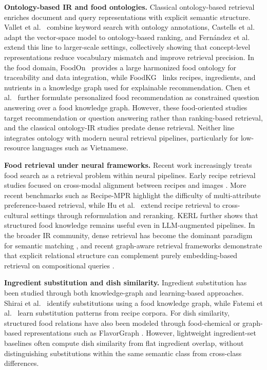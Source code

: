 \label{sec:related_work}

\textbf{Ontology-based IR and food ontologies.}
Classical ontology-based retrieval enriches document and query representations with explicit semantic structure. Vallet et al.~\cite{vallet2005ontology} combine keyword search with ontology annotations, Castells et al.~\cite{castells2007adaptation} adapt the vector-space model to ontology-based ranking, and Fern\'{a}ndez et al.~\cite{fernandez2011semantic} extend this line to larger-scale settings, collectively showing that concept-level representations reduce vocabulary mismatch and improve retrieval precision. In the food domain, FoodOn~\cite{dooley2018foodon} provides a large harmonized food ontology for traceability and data integration, while FoodKG~\cite{haussmann2019foodkg} links recipes, ingredients, and nutrients in a knowledge graph used for explainable recommendation. Chen et al.~\cite{chen2021personalized} further formulate personalized food recommendation as constrained question answering over a food knowledge graph. However, these food-oriented studies target recommendation or question answering rather than ranking-based retrieval, and the classical ontology-IR studies predate dense retrieval. Neither line integrates ontology with modern neural retrieval pipelines, particularly for low-resource languages such as Vietnamese.

\textbf{Food retrieval under neural frameworks.}
Recent work increasingly treats food search as a retrieval problem
within neural pipelines. Early recipe retrieval studies focused on
cross-modal alignment between recipes and images
\cite{carvalho2018crossmodal, lien2020recipe}. More recent benchmarks
such as Recipe-MPR \cite{zhang2023recipempr} highlight the difficulty
of multi-attribute preference-based retrieval, while Hu et
al.~\cite{hu2024bridging} extend recipe retrieval to cross-cultural
settings through reformulation and reranking. KERL
\cite{mohbat2025kerl} further shows that structured food knowledge
remains useful even in LLM-augmented pipelines. In the broader IR
community, dense retrieval has become the dominant paradigm for
semantic matching \cite{karpukhin2020dense, thakur2021beir}, and
recent graph-aware retrieval frameworks demonstrate that explicit
relational structure can complement purely embedding-based retrieval
on compositional queries \cite{he2024g, hipporag2024, kg2rag2025}.

\textbf{Ingredient substitution and dish similarity.}
Ingredient substitution has been studied through both knowledge-graph and learning-based approaches. Shirai et al.~\cite{shirai2021identifying} identify substitutions using a food knowledge graph, while Fatemi et al.~\cite{fatemi2023learning} learn substitution patterns from recipe corpora. For dish similarity, structured food relations have also been modeled through food-chemical or graph-based representations such as FlavorGraph \cite{park2021flavorgraph}. However, lightweight ingredient-set baselines often compute dish similarity from flat ingredient overlap, without distinguishing substitutions within the same semantic class from cross-class differences.

